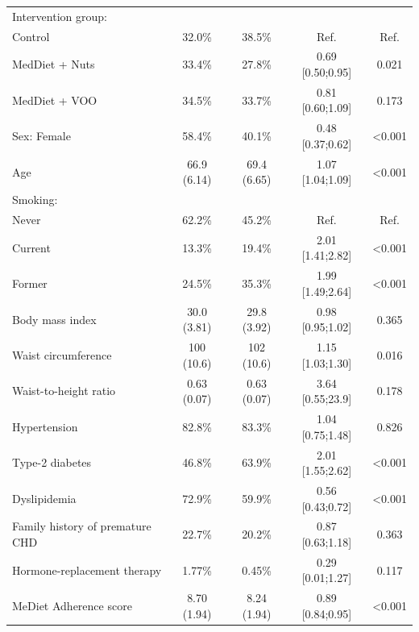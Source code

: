 \documentclass[
]{book}
\begin{document}
\begin{longtable}[t]{lcccc}
Intervention group: &  &  &  & \\
\hspace{1em}Control & 32.0\% & 38.5\% & Ref. & Ref.\\
\hspace{1em}MedDiet + Nuts & 33.4\% & 27.8\% & 0.69 [0.50;0.95] & 0.021\\
\hspace{1em}MedDiet + VOO & 34.5\% & 33.7\% & 0.81 [0.60;1.09] & 0.173\\
Sex: Female & 58.4\% & 40.1\% & 0.48 [0.37;0.62] & <0.001\\
Age & 66.9 (6.14) & 69.4 (6.65) & 1.07 [1.04;1.09] & <0.001\\
Smoking: &  &  &  & \\
\hspace{1em}Never & 62.2\% & 45.2\% & Ref. & Ref.\\
\hspace{1em}Current & 13.3\% & 19.4\% & 2.01 [1.41;2.82] & <0.001\\
\hspace{1em}Former & 24.5\% & 35.3\% & 1.99 [1.49;2.64] & <0.001\\
Body mass index & 30.0 (3.81) & 29.8 (3.92) & 0.98 [0.95;1.02] & 0.365\\
Waist circumference & 100 (10.6) & 102 (10.6) & 1.15 [1.03;1.30] & 0.016\\
Waist-to-height ratio & 0.63 (0.07) & 0.63 (0.07) & 3.64 [0.55;23.9] & 0.178\\
Hypertension & 82.8\% & 83.3\% & 1.04 [0.75;1.48] & 0.826\\
Type-2 diabetes & 46.8\% & 63.9\% & 2.01 [1.55;2.62] & <0.001\\
Dyslipidemia & 72.9\% & 59.9\% & 0.56 [0.43;0.72] & <0.001\\
Family history of premature CHD & 22.7\% & 20.2\% & 0.87 [0.63;1.18] & 0.363\\
Hormone-replacement therapy & 1.77\% & 0.45\% & 0.29 [0.01;1.27] & 0.117\\
MeDiet Adherence score & 8.70 (1.94) & 8.24 (1.94) & 0.89 [0.84;0.95] & <0.001\\*
\end{longtable}
\end{document}
